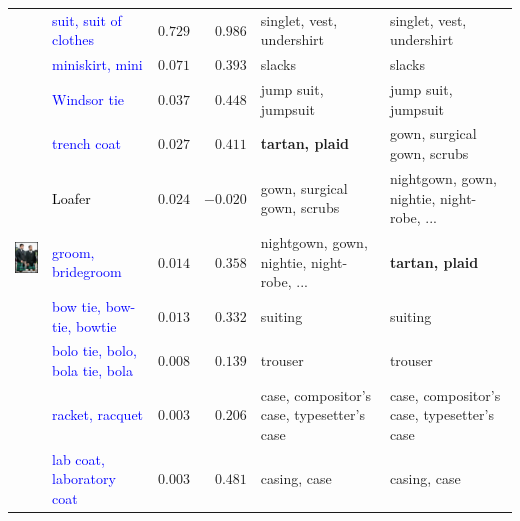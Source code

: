 \documentclass[11pt,letterpaper]{article}
\begin{document}
\begin{table}[t]
\begin{center}
\begin{small}
{\begin{tabular}{clrrll}
\multirow{10}{*}{\includegraphics[height=10em]{n04395106_19387.JPEG}}
& \textcolor{blue}{suit, suit of clothes} & $0.729$& $0.986$& singlet, vest, undershirt & singlet, vest, undershirt \\
& \textcolor{blue}{miniskirt, mini} & $0.071$& $0.393$& slacks & slacks \\
& \textcolor{blue}{Windsor tie} & $0.037$& $0.448$& jump suit, jumpsuit & jump suit, jumpsuit \\
& \textcolor{blue}{trench coat} & $0.027$& $0.411$& \textbf{tartan, plaid} & gown, surgical gown, scrubs \\
& \textcolor{black}{Loafer} & $0.024$& $-0.020$& gown, surgical gown, scrubs & nightgown, gown, nightie, night-robe, ... \\
& \textcolor{blue}{groom, bridegroom} & $0.014$& $0.358$& nightgown, gown, nightie, night-robe, ... & \textbf{tartan, plaid} \\
& \textcolor{blue}{bow tie, bow-tie, bowtie} & $0.013$& $0.332$& suiting & suiting \\
& \textcolor{blue}{bolo tie, bolo, bola tie, bola} & $0.008$& $0.139$& trouser & trouser \\
& \textcolor{blue}{racket, racquet} & $0.003$& $0.206$& case, compositor's case, typesetter's case & case, compositor's case, typesetter's case \\
& \textcolor{blue}{lab coat, laboratory coat} & $0.003$& $0.481$& casing, case & casing, case \\

\midrule


\end{tabular}}
\end{small}
\end{center}
\end{table}
\end{document}

